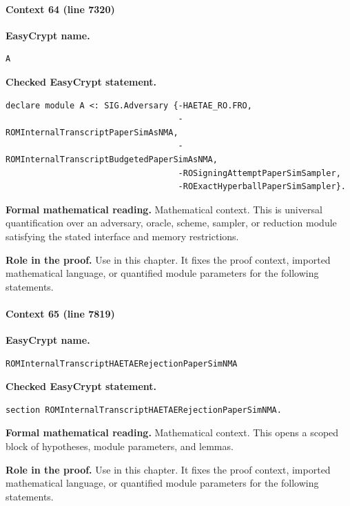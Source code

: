 \paragraph{Context 64 (line 7320)}
\noindent\textbf{EasyCrypt name.}
\begin{lstlisting}[language=EasyCrypt,basicstyle=\ttfamily\scriptsize]
A
\end{lstlisting}
\noindent\textbf{Checked EasyCrypt statement.}
\begin{lstlisting}[language=EasyCrypt,basicstyle=\ttfamily\scriptsize]
declare module A <: SIG.Adversary {-HAETAE_RO.FRO,
                                   -ROMInternalTranscriptPaperSimAsNMA,
                                   -ROMInternalTranscriptBudgetedPaperSimAsNMA,
                                   -ROSigningAttemptPaperSimSampler,
                                   -ROExactHyperballPaperSimSampler}.
\end{lstlisting}
\noindent\textbf{Formal mathematical reading.}
Mathematical context. This is universal quantification over an adversary, oracle, scheme, sampler, or reduction module satisfying the stated interface and memory restrictions.

\noindent\textbf{Role in the proof.}
Use in this chapter. It fixes the proof context, imported mathematical language, or quantified module parameters for the following statements.

\paragraph{Context 65 (line 7819)}
\noindent\textbf{EasyCrypt name.}
\begin{lstlisting}[language=EasyCrypt,basicstyle=\ttfamily\scriptsize]
ROMInternalTranscriptHAETAERejectionPaperSimNMA
\end{lstlisting}
\noindent\textbf{Checked EasyCrypt statement.}
\begin{lstlisting}[language=EasyCrypt,basicstyle=\ttfamily\scriptsize]
section ROMInternalTranscriptHAETAERejectionPaperSimNMA.
\end{lstlisting}
\noindent\textbf{Formal mathematical reading.}
Mathematical context. This opens a scoped block of hypotheses, module parameters, and lemmas.

\noindent\textbf{Role in the proof.}
Use in this chapter. It fixes the proof context, imported mathematical language, or quantified module parameters for the following statements.

